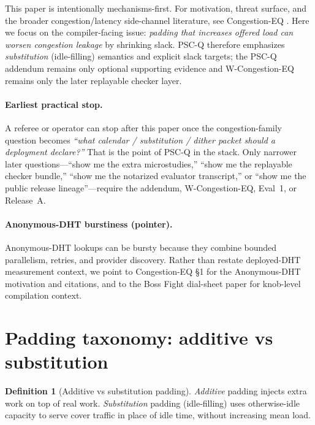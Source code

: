 \documentclass[11pt]{article}
\theoremstyle{definition}
\newtheorem{definition}{Definition}
\theoremstyle{remark}
\begin{document}
This paper is intentionally mechanisms-first.
For motivation, threat surface, and the broader congestion/latency side-channel literature, see Congestion-EQ \cite{series:congeq}.
Here we focus on the compiler-facing issue: \emph{padding that increases offered load can worsen congestion leakage} by shrinking slack.
PSC-Q therefore emphasizes \emph{substitution} (idle-filling) semantics and explicit slack targets; the PSC-Q addendum remains only optional supporting evidence and W-Congestion-EQ remains only the later replayable checker layer.\cite{series:pscqaddendum,series:wcongeq}

\paragraph{Earliest practical stop.}
A referee or operator can stop after this paper once the congestion-family question becomes \emph{``what calendar / substitution / dither packet should a deployment declare?''}
That is the point of PSC-Q in the stack.
Only narrower later questions---``show me the extra microstudies,'' ``show me the replayable checker bundle,'' ``show me the notarized evaluator transcript,'' or ``show me the public release lineage''---require the addendum, W-Congestion-EQ, Eval~1, or Release~A.\cite{series:pscqaddendum,series:wcongeq,series:evalnotary,anondht_release_receipts}

\paragraph{Anonymous-DHT burstiness (pointer).}
Anonymous-DHT lookups can be bursty because they combine bounded parallelism, retries, and provider discovery.
Rather than restate deployed-DHT measurement context, we point to Congestion-EQ \S1 for the Anonymous-DHT motivation and citations, and to the Boss Fight dial-sheet paper for knob-level compilation context.


\section{Padding taxonomy: additive vs substitution}
\begin{definition}[Additive vs substitution padding]
\emph{Additive} padding injects extra work on top of real work.
\emph{Substitution} padding (idle-filling) uses otherwise-idle capacity to serve cover traffic in place of idle time, without increasing mean load.
\end{definition}
\end{document}
